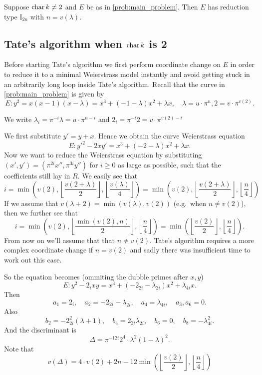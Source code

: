 \begin{proposition}
	Suppose $\operatorname{char} k \ne 2$ and $E$ be as in \cref{prob:main_problem}. 
	Then $E$ has reduction type $\mathrm I_{2n}$ with $n = v(\lambda)$. 
\end{proposition}

\subsection{Tate's algorithm when $\operatorname{char} k$ is 2}  \label{sec:char_k_is_2}

Before starting Tate's algorithm we first perform coordinate change on $E$ in order to reduce it to a minimal Weierstrass model instantly and avoid getting stuck in an arbitrarily long loop inside Tate's algorithm. 
Recall that the curve in \cref{prob:main_problem} is given by \[
	E: y^2 = x(x-1)(x-\lambda) = x^3 + (-1 -\lambda) x^2 + \lambda x, \quad \lambda = u \cdot \pi^{n}, 2 = v\cdot \pi^{v(2)}
.\] 
\begin{notation}
	We write $\lambda_i = \pi^{-i} \lambda = u\cdot \pi ^{n -i}$ and $2_i = \pi^{-i}2 = v \cdot \pi^{v(2) - i}$
\end{notation}
We first substitute $y' = y + x$. 
Hence we obtain the curve Weierstrass equation \[
	E: y'^2 - 2xy' = x^3 + (-2-\lambda) x^2 + \lambda x
.\] 
Now we want to reduce the Weierstrass equation by substituting $(x', y') = (\pi^{2i} x'', \pi^{3i}y'')$ for $i \ge 0$ as large as possible, such that the coefficients still lay in $R$. 
We easily see that \[
	i =  \min\left(v(2), \left\lfloor \frac{v(2 + \lambda)}{2} \right\rfloor,  \left\lfloor \frac{v(\lambda)}{4} \right\rfloor\right) = \min\left(v(2), \left\lfloor \frac{v(2 + \lambda)}{2} \right\rfloor,  \left\lfloor \frac{n}{4} \right\rfloor\right) 
\]
If we assume that $v(\lambda + 2) = \min(v(\lambda), v(2))$ (e.g.\ when $n \ne v(2)$), then we further see that \[
	i = \min\left(v(2), \left\lfloor \frac{\min (v(2), n)}{2} \right\rfloor,  \left\lfloor \frac{n}{4} \right\rfloor\right)  = \min\left(\left\lfloor \frac{v(2)}{2}\right\rfloor, \left\lfloor \frac{n}{4} \right\rfloor \right)
.\] 
From now on we'll assume that that $n \ne v(2)$. 
Tate's algorithm requires a more complex coordinate change if $n = v(2)$ and sadly there was insufficient time to work out this case. 

So the equation becomes (ommiting the dubble primes after $x, y$) \[
	E: y^2 - 2_i xy = x^3 + (-2_{2i} - \lambda_{2i})x^2 + \lambda_{4i}x
.\] 
Then \[
a_1 = 2_i, \quad a_2 = -2_{2i} - \lambda_{2i}, \quad a_4 =  \lambda_{4i}, \quad a_3, a_6 = 0 
.\] 
Also 
\[
	b_2 = -2_{2i}^2 (\lambda + 1), \quad b_4 = 2_{2i}\lambda_{2i}, \quad b_6 = 0,\quad  b_8 = -\lambda_{4i}^2
.\] 
And the discriminant is \[
	\Delta = \pi^{-12i} 2^{4}\cdot \lambda^2(1 - \lambda)^2
.\] 
Note that \[
	v(\Delta) = 4\cdot v(2)+ 2n - 12 \min\left(\left\lfloor \frac{v(2)}{2}\right\rfloor, \left\lfloor \frac{n}{4} \right\rfloor \right)
\]

